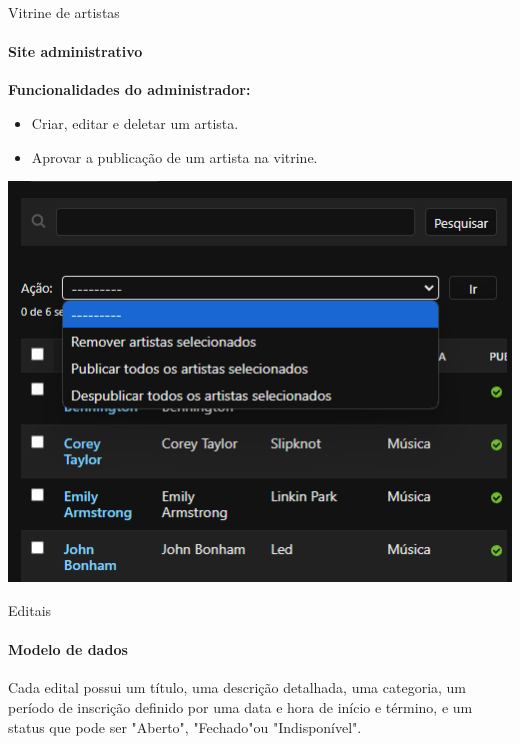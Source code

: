 \begin{frame}{Vitrine de artistas}
\framesubtitle{Site administrativo}
\textbf{Funcionalidades do administrador:}

\begin{itemize}
    \item Criar, editar e deletar um artista.
    \item Aprovar a publicação de um artista na vitrine.
\end{itemize}
    
    \vspace{\baselineskip}
    
        \begin{center}
            \includegraphics[scale=0.4]{beamerthemesrc/assets/admin_artista.png}
        \end{center}
\end{frame}


\begin{frame}{Editais}
\framesubtitle{Modelo de dados}

Cada edital possui um título, uma descrição detalhada,
uma categoria, um período de inscrição definido por uma data e hora de início e término,
e um status que pode ser "Aberto", "Fechado"ou "Indisponível".

\end{frame}

